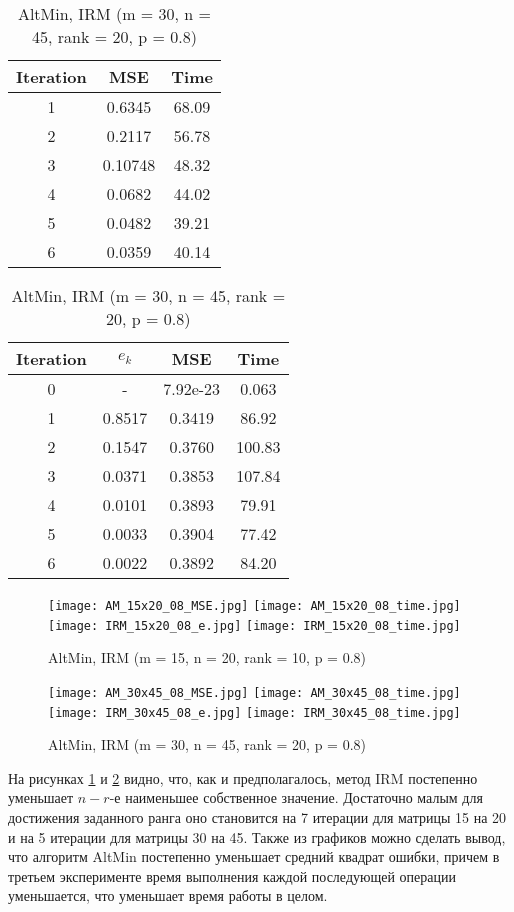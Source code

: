 \documentclass[oneside,final,14pt]{extreport} %
\begin{document}
\begin{table}[ht]
	\centering
	\begin{tabular}{|c|c|c|}
	\hline Iteration & MSE & Time \\ \hline
	1 & 0.6345 & 68.09 \\ \hline
	2 & 0.2117 & 56.78 \\ \hline
	3 & 0.10748 & 48.32 \\ \hline
	4 & 0.0682 & 44.02 \\ \hline
	5 & 0.0482 & 39.21 \\ \hline
	6 & 0.0359 & 40.14 \\ \hline
	\end{tabular}
	\begin{tabular}{|c|c|c|c|}
		\hline Iteration & $e_k$ & MSE & Time \\ \hline
		0 & - & 7.92e-23 & 0.063 \\ \hline
		1 & 0.8517 & 0.3419 & 86.92 \\ \hline
		2 & 0.1547 & 0.3760 & 100.83 \\ \hline
		3 & 0.0371 & 0.3853 & 107.84 \\ \hline
		4 & 0.0101 & 0.3893 & 79.91 \\ \hline
		5 & 0.0033 & 0.3904 & 77.42 \\ \hline
		6 & 0.0022 & 0.3892 & 84.20 \\ \hline
	\end{tabular}
	\caption{AltMin, IRM (m = 30, n = 45, rank = 20, p = 0.8)}
	\label{exp3}
\end{table}

\begin{figure}
	\centering
    \texttt{[image: AM\_15x20\_08\_MSE.jpg]}
    \texttt{[image: AM\_15x20\_08\_time.jpg]}
    \texttt{[image: IRM\_15x20\_08\_e.jpg]}
   	\texttt{[image: IRM\_15x20\_08\_time.jpg]}
    \caption{\label{15x20} AltMin, IRM (m = 15, n = 20, rank = 10, p = 0.8)}
  \end{figure}
  
 \begin{figure}
 	\centering
	\texttt{[image: AM\_30x45\_08\_MSE.jpg]}
    \texttt{[image: AM\_30x45\_08\_time.jpg]}
    \texttt{[image: IRM\_30x45\_08\_e.jpg]}
   	\texttt{[image: IRM\_30x45\_08\_time.jpg]}
   \caption{\label{30x45} AltMin, IRM (m = 30, n = 45, rank = 20, p = 0.8)}
 \end{figure}

На рисунках \ref{15x20} и \ref{30x45} видно, что, как и предполагалось, метод IRM постепенно уменьшает $n-r$-е наименьшее собственное значение. Достаточно малым для достижения заданного ранга оно становится на 7 итерации для матрицы 15 на 20 и на 5 итерации для матрицы 30 на 45. Также из графиков можно сделать вывод, что алгоритм AltMin постепенно уменьшает средний квадрат ошибки, причем в третьем эксперименте время выполнения каждой последующей операции уменьшается, что уменьшает время работы в целом.
\end{document}
